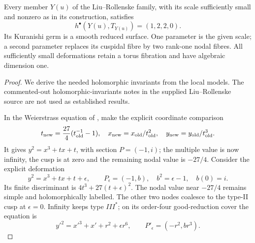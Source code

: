 
\begin{proposition}\label{cdp:st:E14}
Every member $Y(u)$ of the Liu--Rollenske family, with its scale
sufficiently small and nonzero as in its construction, satisfies
\[
 h^\bullet(Y(u),T_{Y(u)})=(1,2,2,0).
\]
Its Kuranishi germ is a smooth reduced surface. One parameter is
the given scale; a second parameter replaces its cuspidal fibre by
two rank-one nodal fibres. All sufficiently small deformations
retain a torus fibration and have algebraic dimension one.
\end{proposition}
\begin{proof}
We derive the needed holomorphic invariants from the local models.
The commented-out holomorphic-invariants notes in the supplied
Liu--Rollenske source are not used as established results.

In the Weierstrass equation of \cite[Proposition labelled
\texttt{prop: surface facts}]{LiuRollenske2026}, make the explicit
coordinate comparison
\[
 t_{\rm new}=\frac{27}{4}(t_{\rm old}^{-1}-1),\quad
 x_{\rm new}=x_{\rm old}/t_{\rm old}^2,\quad
 y_{\rm new}=y_{\rm old}/t_{\rm old}^3.
\]
It gives $y^2=x^3+tx+t$, with section $P=(-1,i)$; the multiple
value is now infinity, the cusp is at zero and the remaining nodal
value is $-27/4$. Consider the explicit deformation
\begin{equation}\label{cdp:eq:E14-elliptic-family}
 y^2=x^3+tx+t+\epsilon,\qquad
 P_\epsilon=(-1,b),\quad b^2=\epsilon-1,
 \quad b(0)=i.
\end{equation}
Its finite discriminant is $4t^3+27(t+\epsilon)^2$.
The nodal value near $-27/4$ remains simple and holomorphically
labelled. The other two nodes coalesce to the type-II cusp at
$\epsilon=0$. Infinity keeps type $III^*$; on its order-four
good-reduction cover the equation is
\[
 y'^2=x'^3+x'+r^2+\epsilon r^6,
 \qquad P'_{\epsilon}=(-r^2,br^3).
\]


\end{proof}
